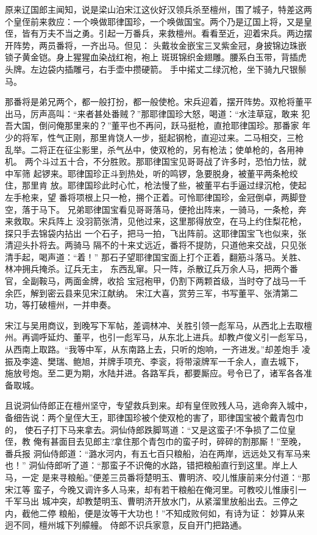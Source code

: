 原来辽国郎主闻知，说是梁山泊宋江这伙好汉领兵杀至檀州，围了城子，特差这两
个皇侄前来救应：一个唤做耶律国珍，一个唤做国宝。两个乃是辽国上将，又是皇
侄，皆有万夫不当之勇。引起一万番兵，来救檀州。看看至近，迎着宋兵。两边摆
开阵势，两员番将，一齐出马。但见：
头戴妆金嵌宝三叉紫金冠，身披锦边珠嵌锁子黄金铠。身上猩猩血染战红袍，袍上
斑斑锦织金翅雕。腰系白玉带，背插虎头牌。左边袋内插雕弓，右手壶中攒硬箭。
手中掿丈二绿沉枪，坐下骑九尺银鬃马。

那番将是弟兄两个，都一般打扮，都一般使枪。宋兵迎着，摆开阵势。双枪将董平
出马，厉声高叫：“来者甚处番贼？”那耶律国珍大怒，喝道：“水洼草寇，敢来
犯吾大国，倒问俺那里来的？”董平也不再问，跃马挺枪，直抢耶律国珍。那番家
年少的将军，性气正刚，那里肯饶人一步，挺起钢枪，直迎过来。二马相交，三枪
乱举。二将正在征尘影里，杀气丛中，使双枪的，另有枪法；使单枪的，各用神机。
两个斗过五十合，不分胜败。那耶律国宝见哥哥战了许多时，恐怕力怯，就中军筛
起锣来。耶律国珍正斗到热处，听的鸣锣，急要脱身，被董平两条枪绞住，那里肯
放。耶律国珍此时心忙，枪法慢了些，被董平右手逼过绿沉枪，使起左手枪来，望
番将项根上只一枪，搠个正着。可怜耶律国珍，金冠倒卓，两脚登空，落于马下。
兄弟耶律国宝看见哥哥落马，便抢出阵来，一骑马，一条枪，奔来救取。宋兵阵上
没羽箭张清，见他过来，这里那得放空，在马上约住梨花枪，探只手去锦袋内拈出
一个石子，把马一拍，飞出阵前。这耶律国宝飞也似来，张清迎头扑将去。两骑马
隔不的十来丈远近，番将不提防，只道他来交战，只见张清手起，喝声道：“着！”
那石子望耶律国宝面上打个正着，翻筋斗落马。关胜、林冲拥兵掩杀。辽兵无主，
东西乱窜。只一阵，杀散辽兵万余人马，把两个番官，全副鞍马，两面金牌，收拾
宝冠袍甲，仍割下两颗首级，当时夺了战马一千余匹，解到密云县来见宋江献纳。
宋江大喜，赏劳三军，书写董平、张清第二功，等打破檀州，一并申奏。

宋江与吴用商议，到晚写下军帖，差调林冲、关胜引领一彪军马，从西北上去取檀
州。再调呼延灼、董平，也引一彪军马，从东北上进兵。却教卢俊义引一彪军马，
从西南上取路。“我等中军，从东南路上去，只听的炮响，一齐进发。”却差炮手
凌振及李逵、樊瑞、鲍旭，并牌手项充、李衮，将带滚牌军一千余人，直去城下，
施放号炮。至二更为期，水陆并进。各路军兵，都要厮应。号令已了，诸军各各准
备取城。

且说洞仙侍郎正在檀州坚守，专望救兵到来。却有皇侄败残人马，逃命奔入城中，
备细告说：两个皇侄大王，耶律国珍被个使双枪的害了，耶律国宝被个戴青包巾的，
使石子打下马来拿去。洞仙侍郎跌脚骂道：“又是这蛮子!不争损了二位皇侄，教
俺有甚面目去见郎主?拿住那个青包巾的蛮子时，碎碎的割那厮！”至晚，番兵报
洞仙侍郎道：“潞水河内，有五七百只粮船，泊在两岸，远远处又有军马来也！”
洞仙侍郎听了道：“那蛮子不识俺的水路，错把粮船直行到这里。岸上人马，一定
是来寻粮船。”便差三员番将楚明玉、曹明济、咬儿惟康前来分付道：“那宋江等
蛮子，今晚又调许多人马来，却有若干粮船在俺河里。可教咬儿惟康引一千军马出
城冲突，却教楚明玉、曹明济开放水门，从紧溜里放船出去。三停之内，截他二停
粮船，便是汝等干大功也！”不知成败何如，有诗为证：
妙算从来迥不同，檀州城下列艨艟。
侍郎不识兵家意，反自开门把路通。

